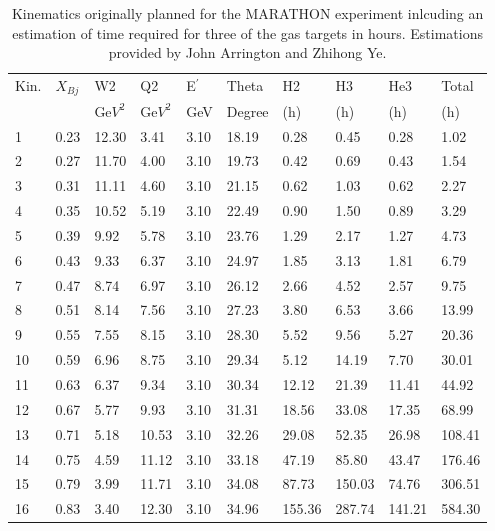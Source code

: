 \begin{table}[t]
		\caption{Kinematics originally planned for the MARATHON experiment inlcuding an estimation of time required for three of the gas targets in hours. Estimations provided by John Arrington and Zhihong Ye\cite{RateEst}. }
	\label{OldKT}
	\begin{tabular}{|l|l|l|l|l|l|l|l|l|l|}
		\hline
		Kin. & $X_{Bj}$& W2    & Q2    & E$^\prime$    & Theta & H2   & H3   & He3   & Total  \\ 
        &&Ge$V^2$&Ge$V^2$& GeV & Degree& (h)& (h)&(h)&(h)  \\ \hline
		1    & 0.23 & 12.30 & 3.41  & 3.10 & 18.19 & 0.28 & 0.45 & 0.28  & 1.02   \\ \hline
		2    & 0.27 & 11.70 & 4.00  & 3.10 & 19.73 & 0.42 & 0.69 & 0.43  & 1.54   \\ \hline
		3    & 0.31 & 11.11 & 4.60  & 3.10 & 21.15 & 0.62 & 1.03 & 0.62  & 2.27   \\ \hline
		4    & 0.35 & 10.52 & 5.19  & 3.10 & 22.49 & 0.90 & 1.50 & 0.89  & 3.29   \\ \hline
		5    & 0.39 & 9.92  & 5.78  & 3.10 & 23.76 & 1.29 & 2.17 & 1.27  & 4.73   \\ \hline
		6    & 0.43 & 9.33  & 6.37  & 3.10 & 24.97 & 1.85 & 3.13 & 1.81  & 6.79   \\ \hline
		7    & 0.47 & 8.74  & 6.97  & 3.10 & 26.12 & 2.66 & 4.52 & 2.57  & 9.75   \\ \hline
		8    & 0.51 & 8.14  & 7.56  & 3.10 & 27.23 & 3.80 & 6.53 & 3.66  & 13.99  \\ \hline
		9    & 0.55 & 7.55  & 8.15  & 3.10 & 28.30 & 5.52 & 9.56 & 5.27  & 20.36  \\ \hline
		10   & 0.59 & 6.96  & 8.75  & 3.10 & 29.34 & 5.12 & 14.19& 7.70  & 30.01  \\ \hline
		11   & 0.63 & 6.37  & 9.34  & 3.10 & 30.34 & 12.12& 21.39& 11.41 & 44.92  \\ \hline
		12   & 0.67 & 5.77  & 9.93  & 3.10 & 31.31 & 18.56& 33.08& 17.35 & 68.99  \\ \hline
		13   & 0.71 & 5.18  & 10.53 & 3.10 & 32.26 & 29.08& 52.35& 26.98 & 108.41 \\ \hline
		14   & 0.75 & 4.59  & 11.12 & 3.10 & 33.18 & 47.19& 85.80& 43.47 & 176.46 \\ \hline
		15   & 0.79 & 3.99  & 11.71 & 3.10 & 34.08 & 87.73&150.03& 74.76 & 306.51 \\ \hline
		16   & 0.83 & 3.40  & 12.30 & 3.10 & 34.96 &155.36&287.74&141.21 & 584.30 \\ \hline
	\end{tabular}
\end{table}

